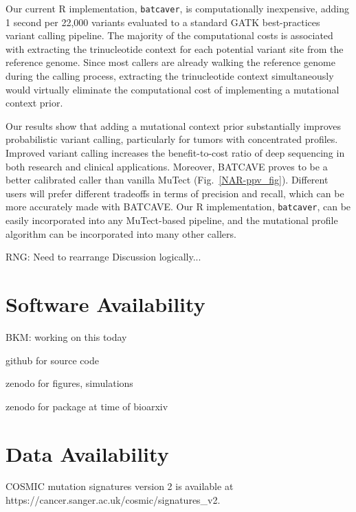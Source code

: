 \documentclass[a4,center,fleqn]{NAR}
\newcommand{\rngcomment}[1]{{\color{red}RNG: #1}}
\newcommand{\bkmcomment}[1]{{\color{blue}BKM: #1}}
\newcommand{\batcave}{BATCAVE\xspace}
\begin{document}
Our current R implementation, \texttt{batcaver}, is computationally inexpensive, adding 1 second per 22,000 variants evaluated to a standard GATK best-practices variant calling pipeline.
The majority of the computational costs is associated with extracting the trinucleotide context for each potential variant site from the reference genome.
Since most callers are already walking the reference genome during the calling process, extracting the trinucleotide context simultaneously would virtually eliminate the computational cost of implementing a mutational context prior.

Our results show that adding a mutational context prior substantially improves probabilistic variant calling, particularly for tumors with concentrated profiles.
Improved variant calling increases the benefit-to-cost ratio of deep sequencing in both research and clinical applications.
Moreover, \batcave proves to be a better calibrated caller than vanilla MuTect (Fig.~\ref{NAR-ppv_fig}).
Different users will prefer different tradeoffs in terms of precision and recall, which can be more accurately made with \batcave.
Our R implementation, \texttt{batcaver}, can be easily incorporated into any MuTect-based pipeline, and the mutational profile algorithm can be incorporated into many other callers.

\rngcomment{Need to rearrange Discussion logically...}


\section{Software Availability}
\bkmcomment{working on this today}

github for source code

zenodo for figures, simulations

zenodo for package at time of bioarxiv

\section{Data Availability}
COSMIC mutation signatures version 2 is available at \footnotesize{https://cancer.sanger.ac.uk/cosmic/signatures\_v2}.
\end{document}
